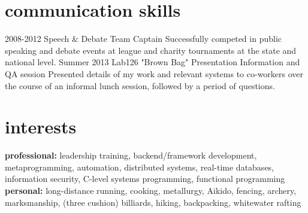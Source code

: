 \documentclass[]{mills-cv} %
\begin{document}
\section{communication skills}

\begin{entrylist}
\entry
{2008-2012}
{Speech \& Debate}
{Team Captain}
{Successfully competed in public speaking and debate events at league and charity tournaments at the state and national level.}
\entry
{Summer 2013}
{Lab126 "Brown Bag" Presentation}
{Information and QA session}
{Presented details of my work and relevant systems to co-workers over the course of an informal lunch session, followed by a period of questions.}
\end{entrylist}


\section{interests}

\textbf{professional:} leadership training, backend/framework development, metaprogramming, automation, distributed systems, real-time databases, information security, C-level systems programming, functional programming \textbf{personal:} long-distance running, cooking, metallurgy, Aikido, fencing, archery, marksmanship, (three cushion) billiards, hiking, backpacking, whitewater rafting
\end{document}
